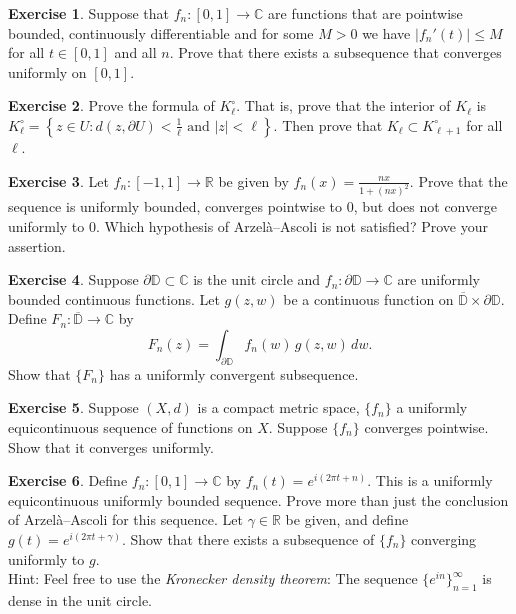 \documentclass[12pt,openany]{book}
\newcommand{\sabs}[1]{\lvert {#1} \rvert}
\newcommand{\C}{{\mathbb{C}}}
\newcommand{\R}{{\mathbb{R}}}
\newcommand{\D}{{\mathbb{D}}}
\newcommand{\myindex}[1]{#1\index{#1}}
\theoremstyle{plain}
\theoremstyle{remark}
\theoremstyle{definition}
\newenvironment{exbox}{%
    \def\FrameCommand{\vrule width 1pt \relax\hspace {10pt}}%
    \MakeFramed {\advance \hsize -\width \FrameRestore }%
}{%
    \endMakeFramed
}
\theoremstyle{exercise}
\newtheorem{exercise}{Exercise}[section]
\theoremstyle{example}
\begin{document}
\begin{exbox}
\begin{exercise}
Suppose that $f_n \colon [0,1] \to \C$ are functions that are pointwise
bounded, continuously differentiable and for some $M> 0$ we have
$\sabs{f_n'(t)} \leq M$ for all $t \in [0,1]$ and all $n$.  Prove that there
exists a subsequence that converges uniformly on $[0,1]$.
\end{exercise}

\begin{exercise}
Prove the formula of $K^\circ_\ell$.  That is, prove that the interior
of $K_\ell$ is
$K^\circ_\ell = \left\{
z \in U : d(z,\partial U) < \frac{1}{\ell} \text{ and } \sabs{z} < \ell
\right\}$.  Then prove that $K_\ell \subset K^\circ_{\ell+1}$ for all $\ell$.
\end{exercise}

\begin{exercise}
Let $f_n \colon [-1,1] \to \R$ be given by $f_n(x) = \frac{nx}{1+{(nx)}^2}$.
Prove that the sequence is uniformly bounded, converges pointwise to 0, but
does not converge uniformly to 0.
Which hypothesis of Arzel\`a--Ascoli
is not satisfied?  Prove your assertion.
\end{exercise}

\begin{exercise}
Suppose $\partial \D \subset \C$ is the unit circle
and
$f_n \colon \partial \D \to \C$ are uniformly bounded continuous functions.
Let $g(z,w)$ be a continuous function on $\overline{\D} \times \partial \D$.
Define
$F_n \colon \overline{\D} \to \C$ by
\begin{equation*}
F_n(z)  = \int_{\partial \D} f_n(w)\, g(z,w) \, dw . 
\end{equation*}
Show that $\{ F_n \}$ has a uniformly convergent subsequence.
\end{exercise}

\begin{exercise}
Suppose $(X,d)$ is a compact metric space, $\{ f_n \}$ a uniformly equicontinuous
sequence of functions on $X$.  Suppose $\{ f_n \}$ converges
pointwise.  Show that it converges uniformly.
\end{exercise}

\begin{exercise}
Define $f_n \colon [0,1] \to \C$ by $f_n(t) = e^{i(2\pi t + n)}$.
This is a uniformly equicontinuous uniformly bounded sequence.
Prove more than just
the conclusion of Arzel\`a--Ascoli for this sequence.  Let $\gamma \in \R$
be given,
and define $g(t) = e^{i(2\pi t + \gamma)}$.  Show that there exists 
a subsequence of $\{ f_n \}$ converging uniformly to $g$.
\\
Hint: Feel free to use the \emph{\myindex{Kronecker density theorem}}:
The sequence $\{ e^{in} \}_{n=1}^\infty$ is dense in the unit circle.
\end{exercise}
\end{exbox}
\end{document}
